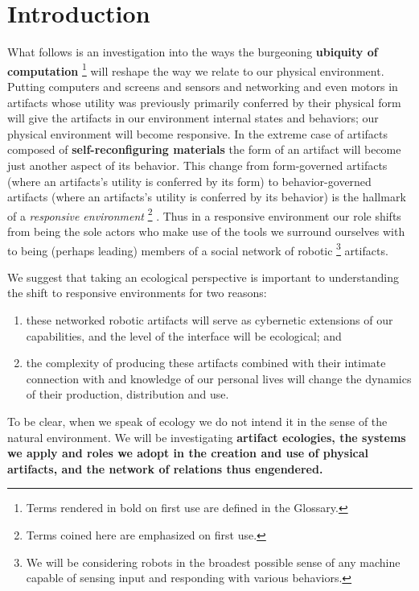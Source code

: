 \chapter{Introduction}
\label{ch:intro}
%
What follows is an investigation into the ways the burgeoning \textbf{ubiquity of computation}%
\footnote{Terms rendered in bold on first use are defined in the Glossary.}
will reshape the way we relate to our physical environment.
Putting computers and screens and sensors and networking and even motors in artifacts whose utility was previously primarily conferred by their physical form will give the artifacts in our environment internal states and behaviors; our physical environment will become responsive.
In the extreme case of artifacts composed of \textbf{self-reconfiguring materials} the form of an artifact will become just another aspect of its behavior.
This change from form-governed artifacts (where an artifacts's utility is conferred by its form) to behavior-governed artifacts (where an artifacts's utility is conferred by its behavior) is the hallmark of a \emph{responsive environment}%
\footnote{Terms coined here are emphasized on first use.}%
.
Thus in a responsive environment our role shifts from being the sole actors who make use of the tools we surround ourselves with to being (perhaps leading) members of a social network of robotic%
\footnote{We will be considering robots in the broadest possible sense of any machine capable of sensing input and responding with various behaviors.}
artifacts.

We suggest that taking an ecological perspective is important to understanding the shift to responsive environments for two reasons:
\begin{enumerate}
\item these networked robotic artifacts will serve as cybernetic extensions of our capabilities, and the level of the interface will be ecological; and
\item the complexity of producing these artifacts combined with their intimate connection with and knowledge of our personal lives will change the dynamics of their production, distribution and use.
\end{enumerate}
To be clear, when we speak of ecology we do not intend it in the sense of the natural environment.
We will be investigating \bf{artifact ecologies}, the systems we apply and roles we adopt in the creation and use of physical artifacts, and the network of relations thus engendered.

